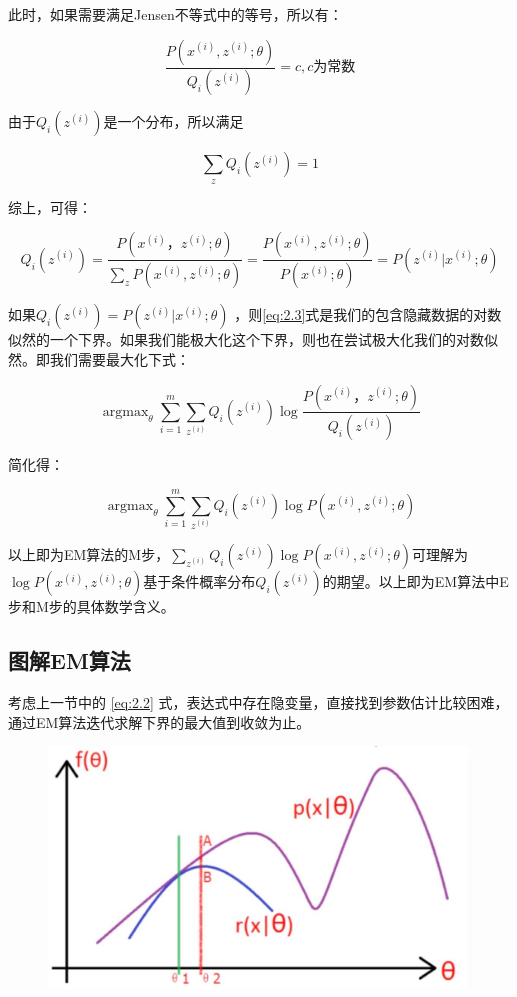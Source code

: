 此时，如果需要满足Jensen不等式中的等号，所以有：

$$
\frac{P(x^{(i)}, z^{(i)};\theta)}{Q_i(z^{(i)})} =c, c为常数
$$

由于$Q_i(z^{(i)})$是一个分布，所以满足

$$
\sum\limits_{z}Q_i(z^{(i)}) =1
$$

综上，可得：

$$
Q_i(z^{(i)})  = \frac{P(x^{(i)}， z^{(i)};\theta)}{\sum\limits_{z}P(x^{(i)}, z^{(i)};\theta)} =  \frac{P(x^{(i)}, z^{(i)};\theta)}{P(x^{(i)};\theta)} = P( z^{(i)}|x^{(i)};\theta)
$$

如果$Q_i(z^{(i)}) = P( z^{(i)}|x^{(i)};\theta)$ ，则\ref{eq:2.3}式是我们的包含隐藏数据的对数似然的一个下界。如果我们能极大化这个下界，则也在尝试极大化我们的对数似然。即我们需要最大化下式：

$$
\mathop{\arg\max}_\theta \sum\limits_{i=1}^m \sum\limits_{z^{(i)}}Q_i(z^{(i)})\log\frac{P(x^{(i)}， z^{(i)};\theta)}{Q_i(z^{(i)})}
$$

简化得：

$$
\mathop{\arg\max}_\theta \sum\limits_{i=1}^m \sum\limits_{z^{(i)}}Q_i(z^{(i)})\log{P(x^{(i)}, z^{(i)};\theta)}
$$

以上即为EM算法的M步，$\sum\limits_{z^{(i)}}Q_i(z^{(i)})\log{P(x^{(i)}, z^{(i)};\theta)}$可理解为$\log P(x^{(i)}, z^{(i)};\theta) $基于条件概率分布$Q_i(z^{(i)}) $的期望。以上即为EM算法中E步和M步的具体数学含义。

\subsection{图解EM算法}


考虑上一节中的 \ref{eq:2.2} 式，表达式中存在隐变量，直接找到参数估计比较困难，通过EM算法迭代求解下界的最大值到收敛为止。

 \begin{figure}[h]
   \centering
   \includegraphics[width=.7\textwidth]{imgs/2.20.1.eps}
 \end{figure}

